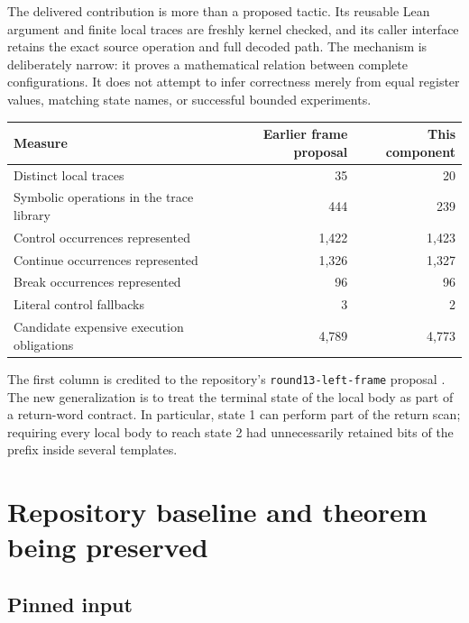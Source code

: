 \documentclass[11pt]{article}
\theoremstyle{definition}\newtheorem{definition}[theorem]{Definition}
\theoremstyle{remark}\newtheorem{remark}[theorem]{Remark}
\newcommand{\code}[1]{\nolinkurl{#1}}
\begin{document}
The delivered contribution is more than a proposed tactic. Its reusable Lean argument and finite local traces are freshly kernel checked, and its caller interface retains the exact source operation and full decoded path. The mechanism is deliberately narrow: it proves a mathematical relation between complete configurations. It does not attempt to infer correctness merely from equal register values, matching state names, or successful bounded experiments.

\begin{center}
\begin{tabular}{lrr}
\toprule
Measure & Earlier frame proposal & This component\\
\midrule
Distinct local traces & 35 & 20\\
Symbolic operations in the trace library & 444 & 239\\
Control occurrences represented & 1,422 & 1,423\\
Continue occurrences represented & 1,326 & 1,327\\
Break occurrences represented & 96 & 96\\
Literal control fallbacks & 3 & 2\\
Candidate expensive execution obligations & 4,789 & 4,773\\
\bottomrule
\end{tabular}
\end{center}

The first column is credited to the repository's \code{round13-left-frame} proposal \cite{prior-frame}. The new generalization is to treat the terminal state of the local body as part of a return-word contract. In particular, state 1 can perform part of the return scan; requiring every local body to reach state 2 had unnecessarily retained bits of the prefix inside several templates.

\section{Repository baseline and theorem being preserved}

\subsection{Pinned input}
\end{document}
